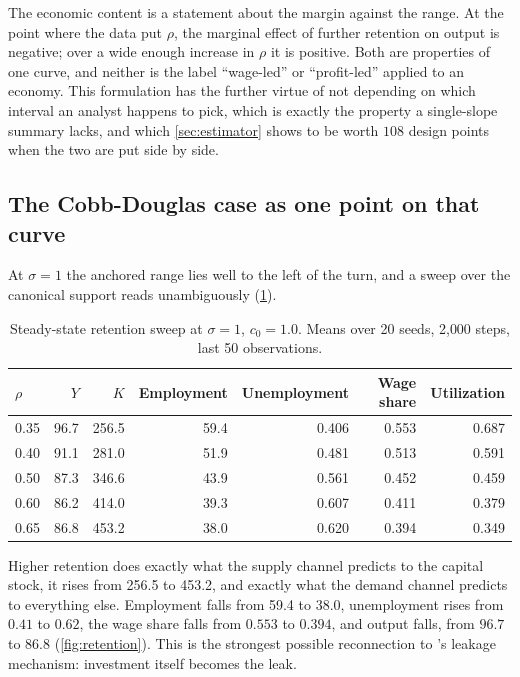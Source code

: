 The economic content is a statement about the margin against the
range. At the point where the data put $\rho$, the marginal effect of
further retention on output is negative; over a wide enough increase in $\rho$
it is positive. Both are properties of one curve, and neither is the label
``wage-led'' or ``profit-led'' applied to an economy. This formulation has the
further virtue of not depending on which interval an analyst happens to pick,
which is exactly the property a single-slope summary lacks, and which
\cref{sec:estimator} shows to be worth $108$ design points when the two are put
side by side.

\subsection{The Cobb-Douglas case as one point on that curve}
\label{sec:baseline}

At $\sigma = 1$ the anchored range lies well to the left of the turn, and a
sweep over the canonical support reads unambiguously (\cref{tab:baseline}).

\begin{table}[htbp]
\centering
\small
\caption{Steady-state retention sweep at $\sigma = 1$, $c_0 = 1.0$.
Means over 20 seeds, 2{,}000 steps, last 50 observations.}
\label{tab:baseline}
\begin{tabular}{lrrrrrr}
\toprule
$\rho$ & $Y$ & $K$ & Employment & Unemployment & Wage share & Utilization\\
\midrule
0.35 & 96.7 & 256.5 & 59.4 & 0.406 & 0.553 & 0.687\\
0.40 & 91.1 & 281.0 & 51.9 & 0.481 & 0.513 & 0.591\\
0.50 & 87.3 & 346.6 & 43.9 & 0.561 & 0.452 & 0.459\\
0.60 & 86.2 & 414.0 & 39.3 & 0.607 & 0.411 & 0.379\\
0.65 & 86.8 & 453.2 & 38.0 & 0.620 & 0.394 & 0.349\\
\bottomrule
\end{tabular}
\end{table}

Higher retention does exactly what the supply channel predicts to the capital
stock, it rises from 256.5 to 453.2, and exactly what the demand channel
predicts to everything else. Employment falls from 59.4 to 38.0, unemployment
rises from $0.41$ to $0.62$, the wage share falls from $0.553$ to $0.394$, and
output falls, from $96.7$ to $86.8$ (\cref{fig:retention}). This is the
strongest possible reconnection to \citeauthor{Teglio2025}'s leakage
mechanism: investment itself becomes the leak.

